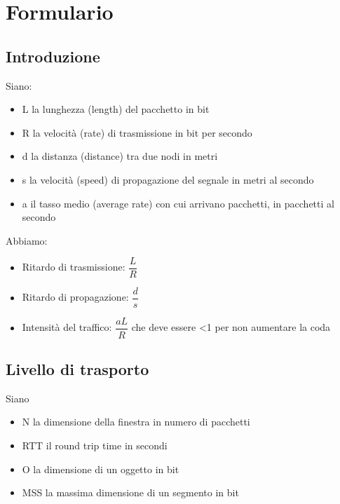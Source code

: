 \documentclass[11pt,a4paper]{book}
\begin{document}
\pagebreak

\chapter{Formulario}
\section{Introduzione}
Siano:
\begin{itemize}
	\item L la lunghezza (length) del pacchetto in bit
	\item R la velocità (rate) di trasmissione in bit per secondo
	\item d la distanza (distance) tra due nodi in metri
	\item s la velocità (speed) di propagazione del segnale in metri al secondo
	\item a il tasso medio (average rate) con cui arrivano pacchetti, in pacchetti al secondo
\end{itemize}

Abbiamo:
\begin{itemize}
	\item Ritardo di trasmissione: $\dfrac{L}{R}$
	\item Ritardo di propagazione: $\dfrac{d}{s}$
	\item Intensità del traffico: $\dfrac{aL}{R}$ che deve essere <1 per non aumentare la coda
\end{itemize}

\section{Livello di trasporto}
Siano
\begin{itemize}
	\item N la dimensione della finestra in numero di pacchetti
	\item RTT il round trip time in secondi
	\item O la dimensione di un oggetto in bit
	\item MSS la massima dimensione di un segmento in bit
\end{itemize}
\end{document}

